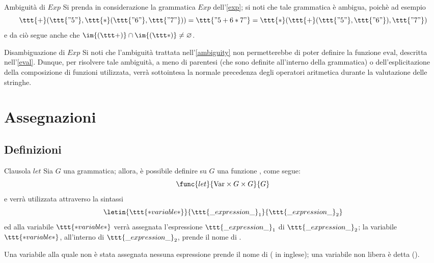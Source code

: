 \documentclass[a4paper, 12pt]{report}
\begin{document}
    \begin{framedobs}[label={ambiguity}]{Ambiguità di $Exp$}
        Si prenda in considerazione la grammatica $Exp$ dell'\cref{exp}; si noti che tale grammatica è ambigua, poichè ad esempio $$\ttt{+}(\ttt{"5"}, \ttt{*}(\ttt{"6"}, \ttt{"7"})) = \ttt{"5 + 6 * 7"} = \ttt{*}(\ttt{+}(\ttt{"5"}, \ttt{"6"}), \ttt{"7"})$$ e da ciò segue anche che $\im{(\ttt+)} \cap \im{(\ttt *)} \neq \varnothing$.
    \end{framedobs}

    \begin{framedobs}{Disambiguazione di $Exp$}
        Si noti che l'ambiguità trattata nell'\cref{ambiguity} non permetterebbe di poter definire la funzione $\mathrm{eval}$, descritta nell'\cref{eval}. Dunque, per risolvere tale ambiguità, a meno di parentesi (che  sono definite all'interno della grammatica) o dell'esplicitazione della composizione di funzioni utilizzata, verrà sottointesa la normale precedenza degli operatori aritmetica durante la valutazione delle stringhe.
    \end{framedobs}

    \section{Assegnazioni}

    \subsection{Definizioni}

    \begin{frameddefn}[label={let}]{Clausola $let$}
        Sia $G$ una grammatica; allora, è possibile definire su $G$ una funzione , come segue: $$\func{let}{\mathrm{Var} \times G \times G}{G}$$ e verrà utilizzata attraverso la sintassi $$\letin{\ttt{*variable*}}{\ttt{\_expression\_}_1}{\ttt{\_expression\_}_2}$$ ed alla variabile $\ttt{*variable*}$ verrà assegnata l'espressione $\ttt{\_expression\_}_1$  di $\ttt{\_expression\_}_2$; la variabile $\ttt{*variable*}$, all'interno di $\ttt{\_expression\_}_2$, prende il nome di .

        Una variabile alla quale non è stata assegnata nessuna espressione prende il nome di  ( in inglese); una variabile non libera è detta  ().
    \end{frameddefn}
    
\end{document}
